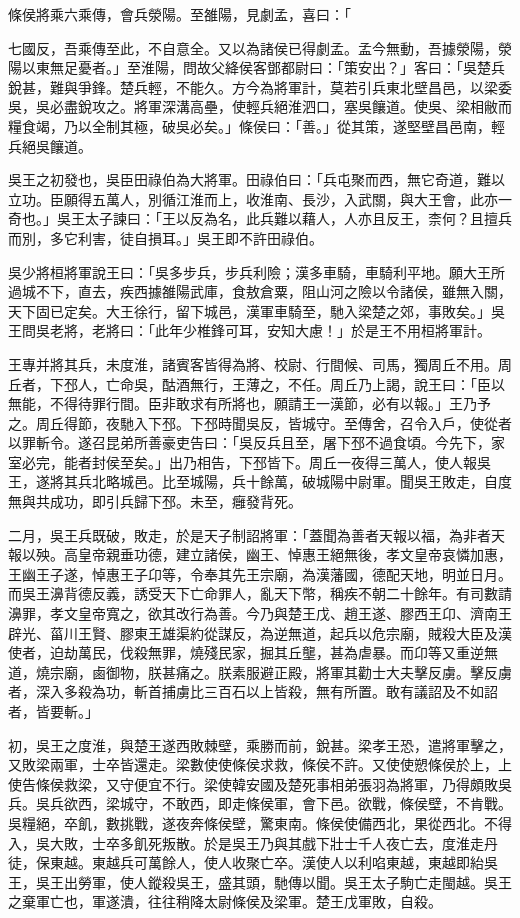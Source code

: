 \begin{pinyinscope}
條侯將乘六乘傳，會兵滎陽。至雒陽，見劇孟，喜曰：「

七國反，吾乘傳至此，不自意全。又以為諸侯已得劇孟。孟今無動，吾據滎陽，滎陽以東無足憂者。」至淮陽，問故父絳侯客鄧都尉曰：「策安出？」客曰：「吳楚兵銳甚，難與爭鋒。楚兵輕，不能久。方今為將軍計，莫若引兵東北壁昌邑，以梁委吳，吳必盡銳攻之。將軍深溝高壘，使輕兵絕淮泗口，塞吳饟道。使吳、梁相敝而糧食竭，乃以全制其極，破吳必矣。」條侯曰：「善。」從其策，遂堅壁昌邑南，輕兵絕吳饟道。

吳王之初發也，吳臣田祿伯為大將軍。田祿伯曰：「兵屯聚而西，無它奇道，難以立功。臣願得五萬人，別循江淮而上，收淮南、長沙，入武關，與大王會，此亦一奇也。」吳王太子諫曰：「王以反為名，此兵難以藉人，人亦且反王，柰何？且擅兵而別，多它利害，徒自損耳。」吳王即不許田祿伯。

吳少將桓將軍說王曰：「吳多步兵，步兵利險；漢多車騎，車騎利平地。願大王所過城不下，直去，疾西據雒陽武庫，食敖倉粟，阻山河之險以令諸侯，雖無入關，天下固已定矣。大王徐行，留下城邑，漢軍車騎至，馳入梁楚之郊，事敗矣。」吳王問吳老將，老將曰：「此年少椎鋒可耳，安知大慮！」於是王不用桓將軍計。

王專并將其兵，未度淮，諸賓客皆得為將、校尉、行間候、司馬，獨周丘不用。周丘者，下邳人，亡命吳，酤酒無行，王薄之，不任。周丘乃上謁，說王曰：「臣以無能，不得待罪行間。臣非敢求有所將也，願請王一漢節，必有以報。」王乃予之。周丘得節，夜馳入下邳。下邳時聞吳反，皆城守。至傳舍，召令入戶，使從者以罪斬令。遂召昆弟所善豪吏告曰：「吳反兵且至，屠下邳不過食頃。今先下，家室必完，能者封侯至矣。」出乃相告，下邳皆下。周丘一夜得三萬人，使人報吳王，遂將其兵北略城邑。比至城陽，兵十餘萬，破城陽中尉軍。聞吳王敗走，自度無與共成功，即引兵歸下邳。未至，癰發背死。

二月，吳王兵既破，敗走，於是天子制詔將軍：「蓋聞為善者天報以福，為非者天報以殃。高皇帝親垂功德，建立諸侯，幽王、悼惠王絕無後，孝文皇帝哀憐加惠，王幽王子遂，悼惠王子卬等，令奉其先王宗廟，為漢藩國，德配天地，明並日月。而吳王濞背德反義，誘受天下亡命罪人，亂天下幣，稱疾不朝二十餘年。有司數請濞罪，孝文皇帝寬之，欲其改行為善。今乃與楚王戊、趙王遂、膠西王卬、濟南王辟光、菑川王賢、膠東王雄渠約從謀反，為逆無道，起兵以危宗廟，賊殺大臣及漢使者，迫劫萬民，伐殺無罪，燒殘民家，掘其丘壟，甚為虐暴。而卬等又重逆無道，燒宗廟，鹵御物，朕甚痛之。朕素服避正殿，將軍其勸士大夫擊反虜。擊反虜者，深入多殺為功，斬首捕虜比三百石以上皆殺，無有所置。敢有議詔及不如詔者，皆要斬。」

初，吳王之度淮，與楚王遂西敗棘壁，乘勝而前，銳甚。梁孝王恐，遣將軍擊之，又敗梁兩軍，士卒皆還走。梁數使使條侯求救，條侯不許。又使使愬條侯於上，上使告條侯救梁，又守便宜不行。梁使韓安國及楚死事相弟張羽為將軍，乃得頗敗吳兵。吳兵欲西，梁城守，不敢西，即走條侯軍，會下邑。欲戰，條侯壁，不肯戰。吳糧絕，卒飢，數挑戰，遂夜奔條侯壁，驚東南。條侯使備西北，果從西北。不得入，吳大敗，士卒多飢死叛散。於是吳王乃與其戲下壯士千人夜亡去，度淮走丹徒，保東越。東越兵可萬餘人，使人收聚亡卒。漢使人以利啗東越，東越即紿吳王，吳王出勞軍，使人鏦殺吳王，盛其頭，馳傳以聞。吳王太子駒亡走閩越。吳王之棄軍亡也，軍遂潰，往往稍降太尉條侯及梁軍。楚王戊軍敗，自殺。


\end{pinyinscope}
